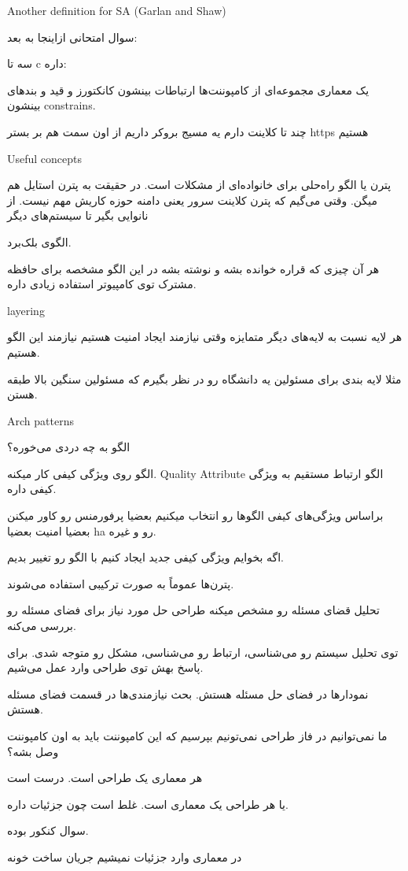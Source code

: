 Another definition for SA (Garlan and Shaw)

سوال امتحانی ازاینجا به بعد:

سه تا c داره:

یک معماری مجموعه‌ای از کامپوننت‌ها ارتباطات بینشون کانکتورز و قید و بند‌های
بینشون constrains.

چند تا کلاینت دارم
یه مسیج بروکر داریم
از اون سمت هم بر بستر https هستیم

Useful concepts

پترن یا الگو راه‌حلی برای خانواده‌ای از مشکلات است.  در حقیقت به پترن استایل هم
میگن. وقتی می‌گیم که پترن کلاینت سرور یعنی دامنه حوزه کاریش مهم نیست. از نانوایی
بگیر تا سیستم‌های دیگر

الگوی بلک‌برد.

هر آن چیزی که قراره خوانده بشه و نوشته بشه در این الگو مشخصه برای حافظه مشترک
توی کامپیوتر استفاده زیادی داره.

layering

هر لایه نسبت به لایه‌های دیگر متمایزه وقتی نیازمند ایجاد امنیت هستیم نیازمند این
الگو هستیم.

مثلا لایه بندی برای مسئولین یه دانشگاه رو در نظر بگیرم که مسئولین سنگین بالا
طبقه هستن.

Arch patterns

الگو به چه دردی می‌خوره؟

الگو روی ویژگی کیفی کار میکنه. Quality Attribute 
الگو ارتباط مستقیم به ویژگی کیفی داره.

براساس ویژگی‌های کیفی الگوها رو انتخاب میکنیم بعضیا پرفورمنس رو کاور میکنن بعضیا
امنیت بعضیا ha رو و غیره.

اگه بخوایم ویژگی کیفی جدید ایجاد کنیم با الگو رو تغییر بدیم.

پترن‌ها عموماً به صورت ترکیبی استفاده می‌شوند.

تحلیل قضای مسئله رو مشخص میکنه
طراحی حل مورد نیاز برای فضای مسئله رو بررسی می‌کنه.

توی تحلیل سیستم رو می‌شناسی، ارتباط رو می‌شناسی، مشکل رو متوجه شدی.
برای پاسخ بهش توی طراحی وارد عمل می‌شیم.

نمودار‌ها در فضای حل مسئله هستش.
بحث نیازمندی‌ها در قسمت فضای مسئله هستش.

ما نمی‌توانیم در فاز طراحی نمی‌تونیم بپرسیم که این کامپوننت باید به اون کامپوننت
وصل بشه؟

هر معماری یک طراحی است. درست است

یا هر طراحی یک معماری است. غلط است چون جزئیات داره.

سوال کنکور بوده.

در معماری وارد جزئیات نمیشیم جریان ساخت خونه 

